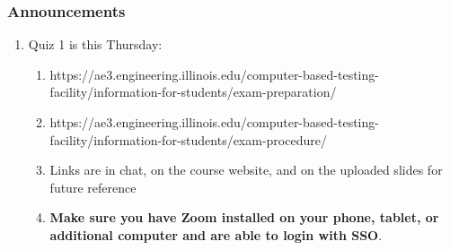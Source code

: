 \documentclass{beamer}
\begin{document}
\begin{frame}
  \frametitle{Announcements}
  \begin{enumerate}
    \item Quiz 1 is this Thursday:
      \begin{enumerate}
        \item https://ae3.engineering.illinois.edu/computer-based-testing-facility/information-for-students/exam-preparation/
        \item https://ae3.engineering.illinois.edu/computer-based-testing-facility/information-for-students/exam-procedure/ 
        \item Links are in chat, on the course website, and on the uploaded slides for future reference
        \item \textbf{Make sure you have Zoom installed on your phone, tablet, or additional computer and are able to login with SSO}.
      \end{enumerate}
  \end{enumerate}
\end{frame}
\end{document}
